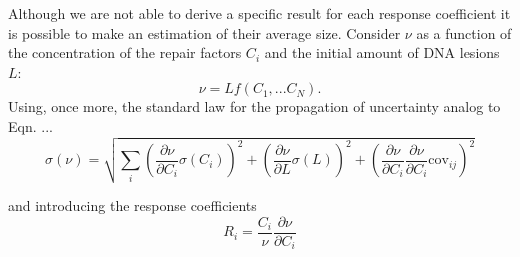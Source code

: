 Although we are not able to derive a specific result for each response coefficient it is possible to make an estimation of their average size. Consider $\nu$ as a function of the concentration of the repair factors $C_i$ and the initial amount of DNA lesions $L$:
\begin{equation}
	\nu = Lf(C_1,...C_N).
\end{equation}
Using, once more, the standard law for the propagation of uncertainty analog to Eqn. ...
 \begin{equation}
 \sigma(\nu) = \sqrt{\sum_{i}\left(\frac{\partial \nu}{\partial C_i}\sigma(C_i) \right)^2 + \left(\frac{\partial \nu}{\partial L}\sigma(L)\right)^2 + \left(\frac{\partial \nu}{\partial C_i} \frac{\partial \nu}{\partial C_i}\textrm{cov}_{ij}\right)^2}
 \end{equation}  
 
 and introducing the response coefficients 
 \begin{equation}
 R_i = \frac{C_i}{\nu}\frac{\partial \nu}{\partial C_i} \nonumber
 \end{equation}
